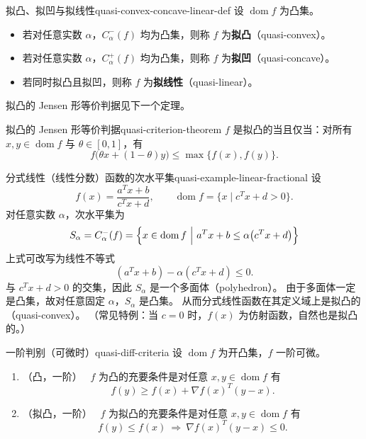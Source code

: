 \documentclass[11pt,a4paper]{article}
\newcommand{\sublevel}[2]{C_{#2}^{-}(#1)}
\newcommand{\suplevel}[2]{C_{#2}^{+}(#1)}
\begin{document}
\begin{definition}{拟凸、拟凹与拟线性}{quasi-convex-concave-linear-def}
设 $\operatorname{dom}f$ 为凸集。
\begin{itemize}
  \item 若对任意实数 $\alpha$，$\sublevel{f}{\alpha}$ 均为凸集，则称 $f$ 为\textbf{拟凸}（quasi-convex）。
  \item 若对任意实数 $\alpha$，$\suplevel{f}{\alpha}$ 均为凸集，则称 $f$ 为\textbf{拟凹}（quasi-concave）。
  \item 若同时拟凸且拟凹，则称 $f$ 为\textbf{拟线性}（quasi-linear）。
\end{itemize}
拟凸的 Jensen 形等价判据见下一个定理。
\end{definition}

\begin{theorem}{拟凸的 Jensen 形等价判据}{quasi-criterion-theorem}
$f$ 是拟凸的当且仅当：对所有 $x,y\in\operatorname{dom}f$ 与
$\theta\in[0,1]$，有
\[
f\bigl(\theta x+(1-\theta)y\bigr)
\le
\max\{f(x),f(y)\}.
\]
\end{theorem}

\begin{example}{分式线性（线性分数）函数的次水平集}{quasi-example-linear-fractional}
设
\[
f(x)=\frac{a^T x+b}{c^T x+d},\qquad
\operatorname{dom}f=\{x\mid c^T x+d>0\}.
\]
对任意实数 $\alpha$，次水平集为
\[
S_\alpha
=
\sublevel{f}{\alpha}
=\Bigl\{
x\in\operatorname{dom}f\ \Big|\
a^T x+b\le \alpha\bigl(c^T x+d\bigr)
\Bigr\}
\]
上式可改写为线性不等式
\[
(a^Tx+b)-\alpha(c^Tx+d)\le 0.
\]
与 $c^Tx+d>0$ 的交集，因此 $S_\alpha$ 是一个多面体（polyhedron）。
由于多面体一定是凸集，故对任意固定 $\alpha$，$S_\alpha$ 是凸集。
从而分式线性函数在其定义域上是拟凸的
（quasi-convex）。
（常见特例：当 $c=0$ 时，$f(x)$ 为仿射函数，自然也是拟凸的。）
\end{example}

\begin{theorem}{一阶判别（可微时）}{quasi-diff-criteria}
设 $\operatorname{dom}f$ 为开凸集，$f$ 一阶可微。
\begin{enumerate}[label={(\alph*)}, leftmargin=2.2em]
  \item \textup{（凸，一阶）\ }
  $f$ 为凸的充要条件是对任意 $x,y\in\operatorname{dom}f$ 有
  \[
  f(y)\ge f(x)+\nabla f(x)^T(y-x).
  \]
  \item \textup{（拟凸，一阶）\ }
  $f$ 为拟凸的充要条件是对任意 $x,y\in\operatorname{dom}f$ 有
  \[
  f(y)\le f(x)\ \Longrightarrow\ \nabla f(x)^T(y-x)\le 0.
  \]
\end{enumerate}
\end{theorem}
\end{document}

